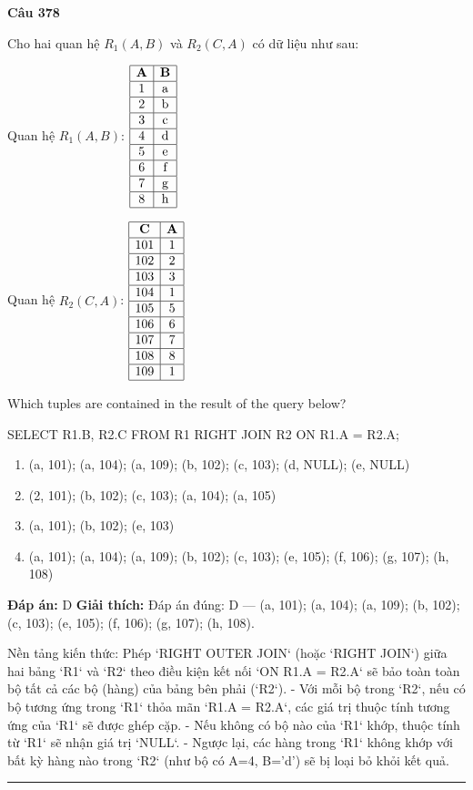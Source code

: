 \documentclass[11pt,a4paper]{article}
\newenvironment{question}[1]{%
  \par\vspace{1em}\noindent\textbf{\large Câu #1}\par\vspace{0.4em}
}{%
  \par\vspace{1em}\hrule\vspace{0.6em}
}
\newenvironment{choices}{%
  \begin{enumerate}[label=\textbf{\Alph*.},leftmargin=2.2em,itemsep=2pt,topsep=3pt]
}{%
  \end{enumerate}
}
\newcommand{\choice}{\item}
\begin{document}
\begin{question}{378}
Cho hai quan hệ \(R_1(A, B)\) và \(R_2(C, A)\) có dữ liệu như sau:

Quan hệ \(R_1(A, B)\):
\(\begin{array}{|c|c|}
\hline
\textbf{A} & \textbf{B} \\
\hline
1 & \text{a} \\
\hline
2 & \text{b} \\
\hline
3 & \text{c} \\
\hline
4 & \text{d} \\
\hline
5 & \text{e} \\
\hline
6 & \text{f} \\
\hline
7 & \text{g} \\
\hline
8 & \text{h} \\
\hline
\end{array}\)

Quan hệ \(R_2(C, A)\):
\(\begin{array}{|c|c|}
\hline
\textbf{C} & \textbf{A} \\
\hline
101 & 1 \\
\hline
102 & 2 \\
\hline
103 & 3 \\
\hline
104 & 1 \\
\hline
105 & 5 \\
\hline
106 & 6 \\
\hline
107 & 7 \\
\hline
108 & 8 \\
\hline
109 & 1 \\
\hline
\end{array}\)

Which tuples are contained in the result of the query below?

SELECT R1.B, R2.C
FROM R1 RIGHT JOIN R2 ON R1.A = R2.A;

\begin{choices}
\choice (a, 101); (a, 104); (a, 109); (b, 102); (c, 103); (d, NULL); (e, NULL)
\choice (2, 101); (b, 102); (c, 103); (a, 104); (a, 105)
\choice (a, 101); (b, 102); (e, 103)
\choice (a, 101); (a, 104); (a, 109); (b, 102); (c, 103); (e, 105); (f, 106); (g, 107); (h, 108)
\end{choices}
\textbf{Đáp án:} D
\textbf{Giải thích:} Đáp án đúng: D — (a, 101); (a, 104); (a, 109); (b, 102); (c, 103); (e, 105); (f, 106); (g, 107); (h, 108).

Nền tảng kiến thức:
Phép `RIGHT OUTER JOIN` (hoặc `RIGHT JOIN`) giữa hai bảng `R1` và `R2` theo điều kiện kết nối `ON R1.A = R2.A` sẽ bảo toàn toàn bộ tất cả các bộ (hàng) của bảng bên phải (`R2`).
- Với mỗi bộ trong `R2`, nếu có bộ tương ứng trong `R1` thỏa mãn `R1.A = R2.A`, các giá trị thuộc tính tương ứng của `R1` sẽ được ghép cặp.
- Nếu không có bộ nào của `R1` khớp, thuộc tính từ `R1` sẽ nhận giá trị `NULL`.
- Ngược lại, các hàng trong `R1` không khớp với bất kỳ hàng nào trong `R2` (như bộ có A=4, B='d') sẽ bị loại bỏ khỏi kết quả.


\end{question}
\end{document}

